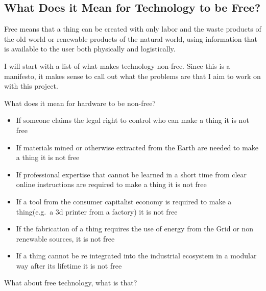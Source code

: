 \subsection{What Does it Mean for Technology to be
Free?}\label{what-does-it-mean-for-technology-to-be-free}

Free means that a thing can be created with only labor and the waste
products of the old world or renewable products of the natural world,
using information that is available to the user both physically and
logistically.

I will start with a list of what makes technology non-free. Since this
is a manifesto, it makes sense to call out what the problems are that I
aim to work on with this project.

What does it mean for hardware to be non-free?

\begin{itemize}
\item
  If someone claims the legal right to control who can make a thing it
  is not free
\item
  If materials mined or otherwise extracted from the Earth are needed to
  make a thing it is not free
\item
  If professional expertise that cannot be learned in a short time from
  clear online instructions are required to make a thing it is not free
\item
  If a tool from the consumer capitalist economy is required to make a
  thing(e.g.~a 3d printer from a factory) it is not free
\item
  If the fabrication of a thing requires the use of energy from the Grid
  or non renewable sources, it is not free
\item
  If a thing cannot be re integrated into the industrial ecosystem in a
  modular way after its lifetime it is not free
\end{itemize}

What about free technology, what is that?

